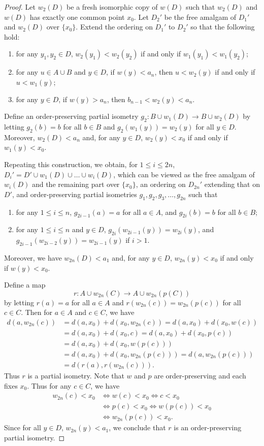 \documentclass[10pt,a4paper]{amsart}
\theoremstyle{definition}
\theoremstyle{remark}
\begin{document}
\begin{proof}
Let $w_2(D)$ be a fresh isomorphic copy of $w(D)$ such that $w_2(D)$ and $w(D)$ has exactly one common point $x_0$. Let $D_2'$ be the free amalgam of $D_1'$ and $w_2(D)$ over $\{x_0\}$. Extend the ordering on $D_1'$ to $D_2'$ so that the following hold:
 \begin{enumerate}
       \item[(d)] for any $y_1,y_2 \in D$, $w_2(y_1) < w_2(y_2)$ if and only if $w_1(y_1) < w_1(y_2)$;
       \item[(e)] for any $u \in A \cup B$ and $y \in D$, if $w(y) < a_n$, then $u<w_2(y)$ if and only if $u<w_1(y)$;
       \item[(f)] for any $y \in D$, if $w(y) > a_n$, then $b_{n-1} < w_2(y) <a_n$. 
    \end{enumerate}
Define an order-preserving partial isometry $g_2\colon B\cup w_1(D)\to B\cup w_2(D)$ by letting $g_2(b)=b$ for all $b\in B$ and $g_2(w_1(y))=w_2(y)$ for all $y\in D$. Moreover, $w_2(D) < a_n$ and, for any $y \in D$, $w_2(y) <x_0$ if and only if $w_1(y)<x_0$.
    
Repeating this construction, we obtain, for $1\leq i \leq 2n$, $D_i'=D' \cup w_1(D) \cup \dots \cup w_i(D)$, which can be viewed as the free amalgam of $w_i(D)$ and the remaining part over $\{x_0\}$, an ordering on $D_{2n}'$ extending that on $D'$, and order-preserving partial isometries $g_1, g_2, g_3, \dots,g_{2n}$ such that 
\begin{enumerate}
\item[(i)] for any $1\leq i\leq n$, $g_{2i-1}(a)=a$ for all $a\in A$, and $g_{2i}(b)=b$ for all $b\in B$;
\item[(ii)] for any $1\leq i\leq n$ and $y\in D$, $g_{2i}(w_{2i-1}(y))=w_{2i}(y)$, and $g_{2i-1}(w_{2i-2}(y))=w_{2i-1}(y)$ if $i>1$.
\end{enumerate}
Moreover, we have $w_{2n}(D) <a_1$ and, for any $y \in D$, $w_{2n}(y) <x_0$ if and only if $w(y)<x_0$. 

Define a map $$r\colon A\cup w_{2n}(C)\to A\cup w_{2n}(p(C))$$ by letting $r(a)=a$ for all $a\in A$ and $r(w_{2n}(c))=w_{2n}(p(c))$ for all $c\in C$. Then for $a \in A$ and $c \in C$,  we have
    \begin{align*}
    d(a,w_{2n}(c)) &=d(a,x_0)+d(x_0,w_{2n}(c))=d(a,x_0)+d(x_0,w(c))\\&=d(a,x_0)+d(x_0,c)=d(a,x_0)+d(x_0,p(c))\\&=d(a,x_0)+d(x_0,w(p(c))) \\
& =d(a,x_0)+d(x_0,w_{2n}(p(c)))=d(a,w_{2n}(p(c))) \\
&=d(r(a),r(w_{2n}(c))).
    \end{align*} 
Thus $r$ is a partial isometry. Note that $w$ and $p$ are order-preserving and each fixes $x_0$. Thus for any $c\in C$, we have 
    \begin{align*}
      w_{2n}(c)<x_0 &\iff w(c)<x_0 \iff c<x_0 \\&\iff p(c) <x_0 \iff w(p(c))<x_0 \\&\iff w_{2n}(p(c))<x_0. 
    \end{align*}
    Since for all $y \in D$, $w_{2n}(y)<a_1$, we conclude that $r$ is an order-preserving partial isometry. 




\end{proof}
\end{document}
